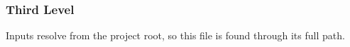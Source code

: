 \subsubsection{Third Level}
Inputs resolve from the project root, so this file is found through its full path.
